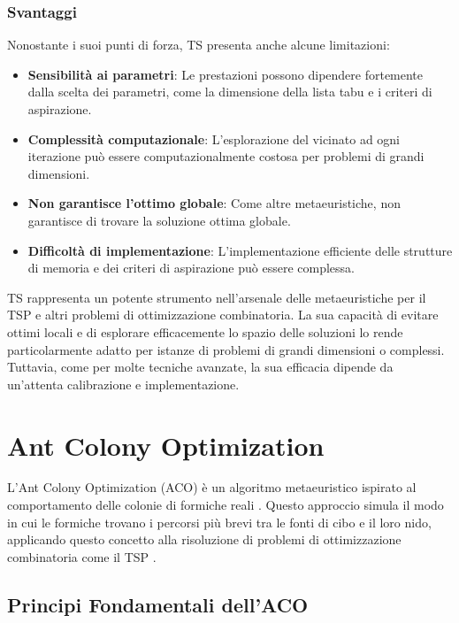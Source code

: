 \subsubsection{Svantaggi}

Nonostante i suoi punti di forza, \gls{TS} presenta anche alcune limitazioni:

\begin{itemize}
	\item \textbf{Sensibilità ai parametri}: Le prestazioni possono dipendere fortemente dalla scelta dei parametri, come la dimensione della lista tabu e i criteri di aspirazione.
	\item \textbf{Complessità computazionale}: L'esplorazione del vicinato ad ogni iterazione può essere computazionalmente costosa per problemi di grandi dimensioni.
	\item \textbf{Non garantisce l'ottimo globale}: Come altre metaeuristiche, non garantisce di trovare la soluzione ottima globale.
	\item \textbf{Difficoltà di implementazione}: L'implementazione efficiente delle strutture di memoria e dei criteri di aspirazione può essere complessa.
\end{itemize}


\gls{TS} rappresenta un potente strumento nell'arsenale delle metaeuristiche per il \gls{TSP} e altri problemi di ottimizzazione combinatoria. La sua capacità di evitare ottimi locali e di esplorare efficacemente lo spazio delle soluzioni lo rende particolarmente adatto per istanze di problemi di grandi dimensioni o complessi. Tuttavia, come per molte tecniche avanzate, la sua efficacia dipende da un'attenta calibrazione e implementazione.

\section{Ant Colony Optimization}

L'Ant Colony Optimization (\gls{ACO}) è un algoritmo metaeuristico ispirato al comportamento delle colonie di formiche reali \cite{dorigo1996ant}. Questo approccio simula il modo in cui le formiche trovano i percorsi più brevi tra le fonti di cibo e il loro nido, applicando questo concetto alla risoluzione di problemi di ottimizzazione combinatoria come il \gls{TSP} \cite{dorigo1997ant}.

\subsection{Principi Fondamentali dell'\gls{ACO}}

